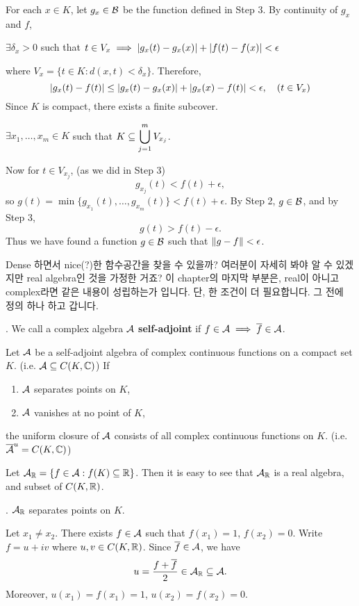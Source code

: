 For each \(x \in K\), let \(g_x \in \mathcal{B}\) be the function defined in Step 3. By continuity of \(g_x\) and \(f\),
\begin{center}
    \(\exists \delta_x > 0\) such that \(t \in V_x \implies \left| g_x(t) - g_x(x) \right| + \left| f(t) - f(x) \right| < \epsilon\)
\end{center}
where \(V_x = \{t \in K : d(x, t) < \delta_x\}\).
Therefore,
\[
    \left| g_x(t) - f(t) \right| \leq \left| g_x(t) - g_x(x) \right| + \left| g_x(x) - f(t) \right| < \epsilon, \quad (t \in V_x)
\]
Since \(K\) is compact, there exists a finite subcover.
\begin{center}
    \(\exists x_1, \dots, x_m \in K\) such that \(\displaystyle K\subseteq \bigcup_{j=1}^m V_{x_j}\).
\end{center}
Now for \(t \in V_{x_j}\), (as we did in Step 3)
\[
    g_{x_j}(t) < f(t) + \epsilon,
\]
so \(g(t) = \min\{g_{x_1}(t), \dots, g_{x_m}(t)\} < f(t) + \epsilon\). By Step 2, \(g \in \mathcal{B}\), and by Step 3,
\[
    g(t) > f(t) - \epsilon.
\]
Thus we have found a function \(g \in \mathcal{B}\) such that \(\left\lVert g - f \right\rVert < \epsilon\).

Dense 하면서 nice(?)한 함수공간을 찾을 수 있을까? 여러분이 자세히 봐야 알 수 있겠지만 real algebra인 것을 가정한 거죠? 이 chapter의 마지막 부분은, real이 아니고 complex라면 같은 내용이 성립하는가 입니다. 단, 한 조건이 더 필요합니다. 그 전에 정의 하나 하고 갑니다.

. We call a complex algebra \(\mathcal{A}\) \textbf{self-adjoint} if \(f \in \mathcal{A} \implies \overline{f} \in \mathcal{A}\).

 Let \(\mathcal{A}\) be a self-adjoint algebra of complex continuous functions on a compact set \(K\). (i.e. \(\mathcal{A} \subseteq C(K, \mathbb{C})\)) If
\begin{enumerate}
    \item \(\mathcal{A}\) separates points on \(K\),
    \item \(\mathcal{A}\) vanishes at no point of \(K\),
\end{enumerate}
the uniform closure of \(\mathcal{A}\) consists of all complex continuous functions on \(K\). (i.e. \(\overline{\mathcal{A}}^u = C(K, \mathbb{C})\))

\pf Let \(\mathcal{A}_{\mathbb{R}} = \{f \in \mathcal{A} : f(K) \subseteq \mathbb{R}\}\). Then it is easy to see that \(\mathcal{A}_{\mathbb{R}}\) is a real algebra, and subset of \(C(K, \mathbb{R})\).

\quad \claim. \(\mathcal{A}_{\mathbb{R}}\) separates points on \(K\).

\quad \pf Let \(x_1 \neq x_2\). There exists \(f \in \mathcal{A}\) such that \(f(x_1) = 1\), \(f(x_2) = 0\). Write \(f = u + iv\) where \(u, v \in C(K, \mathbb{R})\). Since \(\overline{f} \in \mathcal{A}\), we have
\[
    u = \frac{f + \overline{f}}{2} \in \mathcal{A}_{\mathbb{R}} \subseteq \mathcal{A}.
\]
Moreover, \(u(x_1) = f(x_1) = 1\), \(u(x_2) = f(x_2) = 0\).

